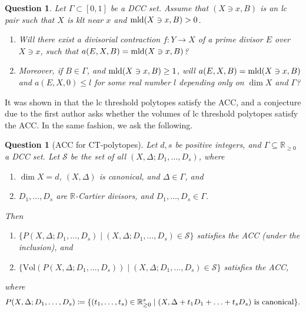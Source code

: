 \documentclass[11pt]{amsart}
\numberwithin{equation}{section}
\newcommand\han[1]{\todo[color=yellow!40]{#1}} %
\newcommand{\Rr}{\mathbb{R}}
\newcommand{\mld}{{\rm{mld}}}
\newcommand{\Ii}{{\Gamma}}
\newcommand{\Ss}{\mathcal{S}}
\newtheorem{ques}[thm]{Question}
\theoremstyle{definition}
\theoremstyle{definition}
\begin{document}

\begin{ques}
Let $\Ii\subset [0,1]$ be a DCC set. Assume that $(X\ni x,B)$ is an lc pair such that $X$ is klt near $x$ and $\mld(X\ni x,B)>0$.


\begin{enumerate}
    \item Will there exist a divisorial contraction $f: Y\rightarrow X$ of a prime divisor $E$ over $X\ni x$, such that $a(E,X,B)=\mld(X\ni x,B)$?
    \item Moreover, if $B\in\Ii$, and $\mld(X\ni x,B)\geq 1$, will $a(E,X,B)=\mld(X\ni x,B)$ and $a(E,X,0)\leq l$ for some real number $l$ depending only on $\dim X$ and $\Ii$?
\end{enumerate}
\end{ques}

It was shown in \cite[Theorem~1.1]{HLQ21} that the lc threshold polytopes satisfy the ACC, and a conjecture due to the first author asks whether the volumes of lc threshold polytopes satisfy the ACC. In the same fashion, we ask the following. 




\medskip


\begin{ques}[ACC for CT-polytopes]\label{ques: ACC for CT-polytopes}
Let $d,s$ be positive integers, and $\Ii \subseteq \Rr_{\ge0}$ a DCC set. Let $\Ss$ be the set of all $(X, \Delta; D_1,\ldots, D_s)$, where
\begin{enumerate}
\item $\dim X=d$, $(X, \Delta)$ is canonical, and $\Delta\in\Ii$, and
\item $D_1, \ldots, D_s$ are $\Rr$-Cartier divisors, and $D_1,\ldots,D_s\in \Ii$.
\end{enumerate}
Then 
\begin{enumerate}
    \item $\{P(X, \Delta; D_1, \ldots, D_s) \mid (X, \Delta; D_1, \ldots, D_s)\in \Ss\}$ satisfies the ACC (under the inclusion), and
    \item $\{\mathrm{Vol}(P(X, \Delta; D_1, \ldots, D_s)) \mid (X, \Delta; D_1, \ldots, D_s)\in \Ss\}$ satisfies the ACC,
\end{enumerate}
where
$$
P(X, \Delta; D_1,\ldots,D_s)\coloneqq\{(t_1,\ldots,t_s) \in \mathbb{R}_{\geq 0}^s\mid (X,\Delta+t_1 D_1+\ldots+t_s D_s){\rm~is~canonical}\}.
$$
\end{ques}

\end{document}
